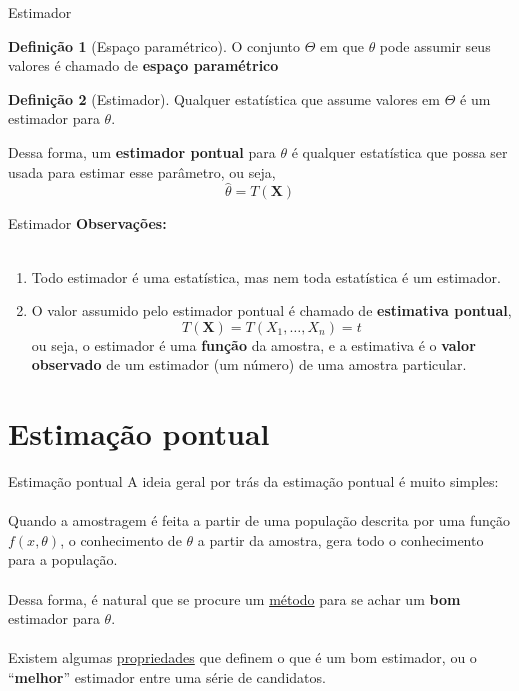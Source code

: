 \documentclass[10pt]{beamer}\usepackage[]{graphicx}\usepackage[]{color}
\newcommand{\mb}[1]{\mathbf{#1}}
\theoremstyle{definition}
\newtheorem*{mydef}{Definição}
\begin{document}
\begin{frame}[fragile]{Estimador}
  \begin{mydef}[Espaço paramétrico]
    O conjunto $\Theta$ em que $\theta$ pode assumir seus valores é
    chamado de \textbf{espaço paramétrico}
  \end{mydef}
  \begin{mydef}[Estimador]
    Qualquer estatística que assume valores em $\Theta$ é um estimador
    para $\theta$.
  \end{mydef}
  Dessa forma, um \textbf{estimador pontual} para $\theta$ é qualquer
  estatística que possa ser usada para estimar esse parâmetro, ou seja,
  \begin{equation*}
    \hat{\theta} = T(\mb{X})
  \end{equation*}
\end{frame}

\begin{frame}[fragile]{Estimador}
  \textbf{Observações:} \\~\\
  \begin{enumerate}
  \item Todo estimador é uma estatística, mas nem toda estatística é um
    estimador.
  \item O valor assumido pelo estimador pontual é chamado de
    \textbf{estimativa pontual},
    \begin{equation*}
      T(\mb{X}) = T(X_1, \ldots, X_n) = t
    \end{equation*}
    ou seja, o estimador é uma \textbf{função} da amostra, e a estimativa
    é o \textbf{valor observado} de um estimador (um número) de uma
    amostra particular.
  \end{enumerate}
\end{frame}

\section{Estimação pontual}

\begin{frame}[fragile]{Estimação pontual}
  A ideia geral por trás da estimação pontual é muito simples: \\~\\
  Quando a amostragem é feita a partir de uma população descrita por uma
  função $f(x,\theta)$, o conhecimento de $\theta$ a partir da amostra,
  gera todo o conhecimento para a população. \\~\\
  Dessa forma, é natural que se procure um \underline{método} para se
  achar um \textbf{bom} estimador para $\theta$. \\~\\
  Existem algumas \underline{propriedades} que definem o que é um bom
  estimador, ou o ``\textbf{melhor}'' estimador entre uma série de
  candidatos.
\end{frame}
\end{document}
